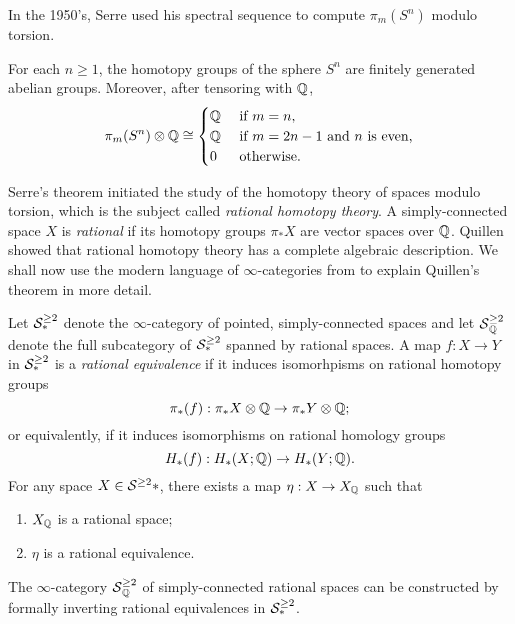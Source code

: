 In the 1950's, Serre used his spectral sequence to compute $\pi_m(S^n)$ modulo torsion.
\begin{theorem}
[Serre]
    For each $n\geq 1$, the homotopy groups of the sphere $S^n$ are finitely generated abelian groups.
    Moreover, after tensoring with ${\mathbb{Q}}$, 
    \[
    \pi_m (S^n)\otimes {\mathbb{Q}} \cong
    \begin{cases}
    {\mathbb{Q}} & \text{ if $m=n$,}\\
    {\mathbb{Q}} & \text{ if $m=2n-1$ and $n$ is even,}\\
    0   & \text{ otherwise.}
    \end{cases}
    \]
\end{theorem}

Serre's theorem initiated the study of the homotopy theory of spaces modulo torsion, which is the subject called \emph{rational homotopy theory}. A simply-connected space $X$ is \emph{rational} if its homotopy groups $\pi_* X$ are vector spaces over ${\mathbb{Q}}$.
Quillen \cite{Quillen_RHT} showed that rational homotopy theory has a complete algebraic description. 
We shall now use the modern language of $\infty$-categories from \cite{HTT} to explain Quillen's theorem in more detail.

Let ${\mathcal{S}}^{\geq 2}_*$ denote the $\infty$-category of pointed, simply-connected spaces and let $\operatorname{\mathcal{S}}^{\geq 2}_{{\mathbb{Q}}}$ denote the full subcategory of ${\mathcal{S}}^{\geq 2}_*$ spanned by rational spaces.
A map $f:X\to Y$ in ${\mathcal{S}}^{\geq 2}_*$ is a \emph{rational equivalence} if it induces isomorhpisms on rational homotopy groups
\[
\pi_*(f): \pi_*X \otimes {\mathbb{Q}} \to \pi_*Y \otimes {\mathbb{Q}};
\]
or equivalently, if it induces isomorphisms on rational homology groups
\[
H_*(f): H_*(X;{\mathbb{Q}})  \to H_*(Y;{\mathbb{Q}}).
\]
For any space $X\in {\mathcal{S}}^{\geq 2}*$, there exists a map $\eta:X\to X_{{\mathbb{Q}}}$ such that
\begin{enumerate}
    \item $X_{{\mathbb{Q}}}$ is a rational space;
    \item $\eta$ is a rational equivalence.
\end{enumerate}
The $\infty$-category $\operatorname{\mathcal{S}}^{\geq 2}_{{\mathbb{Q}}}$ of simply-connected rational spaces can be constructed by formally inverting rational equivalences in ${\mathcal{S}}^{\geq 2}_*$.

